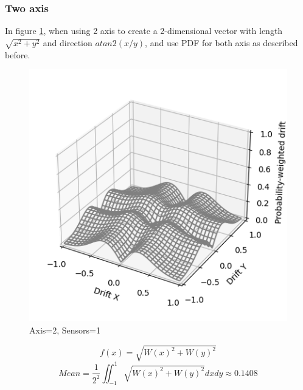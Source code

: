 \documentclass[10pt, twocolumn, a4paper]{article}
\begin{document}
        \subsubsection{Two axis}
            In figure \ref{fig_zero_21}, when using 2 axis to create a 2-dimensional vector with length $\sqrt{x^2 + y^2}$ and direction $ atan2(x / y) $, and use PDF for both axis as described before.
            \begin{figure}[H]
                \begin{center}
                    \caption{Axis=2, Sensors=1}
                    \label{fig_zero_21}
                    \includegraphics[width=0.8\linewidth]{figure_drift_3.png}
                \end{center}
            \end{figure}
            \vspace{-8mm}
            $$ f(x) = \sqrt{W(x)^2 + W(y)^2} $$
            $$ Mean = \frac{1}{2^2} \iint_{-1}^1 \sqrt{W(x)^2 + W(y)^2} dx dy \approx 0.1408 $$
\end{document}
